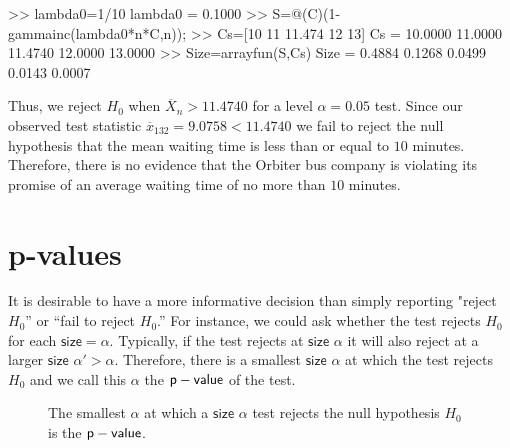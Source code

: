 \begin{example}
\begin{VrbM}
>> lambda0=1/10
lambda0 =    0.1000
>> S=@(C)(1-gammainc(lambda0*n*C,n)); %
>> Cs=[10 11 11.474 12 13] %
Cs =   10.0000   11.0000   11.4740   12.0000   13.0000
>> Size=arrayfun(S,Cs) %
Size =    0.4884    0.1268    0.0499    0.0143    0.0007
\end{VrbM}  
Thus, we reject $H_0$ when $\overline{X}_n>11.4740$ for a level $\alpha=0.05$ test.  Since our observed test statistic $\overline{x}_{132}=9.0758 < 11.4740$ we fail to reject the null hypothesis that the mean waiting time is less than or equal to $10$ minutes.  Therefore, there is no evidence that the Orbiter bus company is violating its promise of an average waiting time of no more than $10$ minutes.
\end{example}



\section{p-values}\label{S:p-values}
It is desirable to have a more informative decision than simply reporting "reject $H_0$'' or ``fail to reject $H_0$.''  For instance, we could ask whether the test rejects $H_0$ for each $\mathsf{size}=\alpha$.  Typically, if the test rejects at $\mathsf{size}$ $\alpha$ it will also reject at a larger $\mathsf{size}$ $\alpha' > \alpha$.  Therefore, there is a smallest $\mathsf{size}$ $\alpha$ at which the test rejects $H_0$ and we call this $\alpha$ the $\mathsf{p-value}$ of the test.

\begin{figure}[h]
\caption{The smallest $\alpha$ at which a $\mathsf{size}$ $\alpha$ test rejects the null hypothesis $H_0$ is the $\mathsf{p-value}$.}\label{F:pvalue}
\begin{center}
\end{center}
\end{figure}


